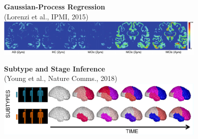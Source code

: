 \documentclass[8pt,xcolor=table,aspectratio=169]{beamer}
\begin{document}
\begin{frame}
\begin{small}
\begin{figure}[h]
  \vspace{2em}
  \begin{minipage}[t][\mnpHeight][t]{0.49\linewidth}
    \centering
    \textbf{Gaussian-Process Regression}\\ \footnotesize{(Lorenzi et al., IPMI, 2015)}
    \includegraphics[width=0.9\textwidth,trim=0 0 0 0, clip]{lorenzi_ipmi2015}
    
    \vspace{2em}
    
  \end{minipage}
  \begin{minipage}[t][\mnpHeight][t]{0.49\linewidth}
    \centering
    \textbf{Subtype and Stage Inference}\\ \footnotesize{(Young et al., Nature Comms., 2018)}
    \includegraphics[width=0.9\textwidth]{sustain}
  \end{minipage}


  \end{figure}
  \end{small}
  
  \vspace{-2em}
  


\end{frame}
\end{document}
